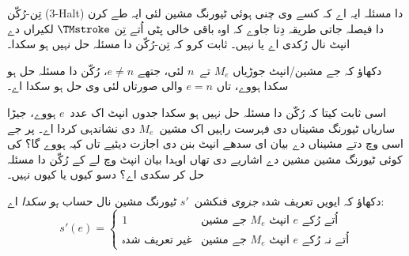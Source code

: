 \documentclass[../../../include/open-logic-section]{subfiles}
\begin{document}
\begin{prob}
تِن-رُکّن (3-Halt) دا مسئلہ ایہ اے کہ کسے وی چنی
ہوئی ٹیورنگ مشین لئی ایہ طے کرن دا فیصلہ جاتی
طریقہ دِتا جاوے کہ اوہ باقی خالی پٹی اُتے تِن
$\TMstroke$ لکیراں دے انپٹ نال رُکدی اے یا نہیں۔
ثابت کرو کہ تِن-رُکّن دا مسئلہ حل نہیں ہو سکدا۔
\end{prob}

\begin{prob}
دکھاؤ کہ جے مشین/انپٹ جوڑیاں $M_e$ تے~$n$
لئی، جتھے $e \neq n$، رُکّن دا مسئلہ حل ہو سکدا
ہووے، تاں $e = n$ والی صورتاں لئی وی حل ہو
سکدا اے۔
\end{prob}

\begin{prob}
اسی ثابت کیتا کہ رُکّن دا مسئلہ حل نہیں ہو سکدا جدوں
انپٹ اک عدد~$e$ ہووے، جیڑا ساریاں ٹیورنگ
مشیناں دی فہرست راہیں اک مشین~$M_e$ دی نشاندہی
کردا اے۔ پر جے اسی  وچ دتے
مشیناں دے بیان ای سدھے
انپٹ بنن دی اجازت دیئیے تاں کیہ ہووے گا؟ کی کوئی
ٹیورنگ مشین مشین دے اشاریے دی تھاں اوہدا بیان
انپٹ وچ لے کے رُکّن دا مسئلہ حل کر سکدی اے؟
دسو کیوں یا کیوں نہیں۔
\end{prob}

\begin{prob} دکھاؤ کہ ایویں تعریف شدہ \emph{جزوی}
فنکشن~$s'$ ٹیورنگ مشین نال حساب \emph{ہو سکدا} اے:
  \[
  s'(e) =
  \begin{cases}
    \text{1} & \text{جے مشین~$M_e$ انپٹ $e$ اُتے رُکے}\\
    \text{غیر تعریف شدہ} & \text{جے مشین~$M_e$ انپٹ $e$ اُتے نہ رُکے}
  \end{cases}
  \]
\end{prob}
\end{document}
